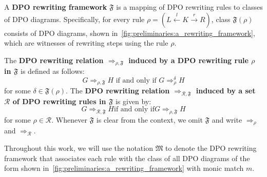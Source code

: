 \begin{definition}
  \label{def:rewriting_framework} 
    A \textbf{DPO rewriting framework} $\mathfrak{F}$ is a mapping of DPO rewriting rules to classes of DPO diagrams. Specifically, for every rule \( \rho = (L \overset{l}{\leftarrow} K \overset{r}{\rightarrow} R) \), class $\mathfrak{F}(\rho)$ consists of DPO diagrams, shown in~\autoref{fig:preliminaries:a_rewriting_framework}, which are witnesses of rewriting steps using the rule \( \rho \).
 \begin{figure}[H]
      \centering
        \caption{}
        \label{fig:preliminaries:a_rewriting_framework}
\end{figure}
    The \textbf{DPO rewriting relation $\Rightarrow_{\rho,\mathfrak{F}}$ induced by a DPO rewriting rule $\rho$ in $\mathfrak{F}$} is defined as follows:
     $$G \Rightarrow_{\rho,\mathfrak{F}} H\text{ if and only if }G \Rightarrow_\rho^\delta H$$
    for some $\delta \in \mathfrak{F}(\rho)$. 
     The \textbf{DPO rewriting relation $\Rightarrow_{\mathcal{R},\mathfrak{F}}$ induced by a set $\mathcal{R}$ of DPO rewriting rules in $\mathfrak{F}$} is given by: 
     $$G \Rightarrow_{\mathcal{R},\mathfrak{F}} H \text{if and only if} G \Rightarrow_{\rho,\mathfrak{F}} H$$ for some $\rho \in \mathcal{R}$. Whenever $\mathfrak{F}$ is clear from the context, we 
    omit $\mathfrak{F}$ and 
    write $\Rightarrow_{\rho}$ and $\Rightarrow_{\mathcal{R}}$.
  \end{definition}
Throughout this work, we will use the notation \(\mathfrak{M}\) to denote the DPO rewriting framework that associates each rule with the class of all DPO diagrams of the form shown in~\autoref{fig:preliminaries:a_rewriting_framework} with monic match $m$.
